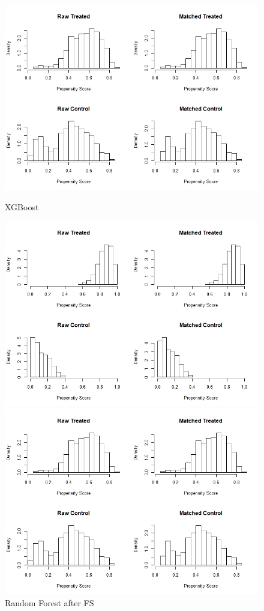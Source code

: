 \documentclass[11pt,a4paper,oneside]{article}
\begin{document}
\begin{figure}[!t]
        \includegraphics[width=\linewidth]{Figures/local_xgb_hist.jpeg}
        \caption{XGBoost}\label{fig:histogram5}
    \endminipage\hfill
        \includegraphics[width=\linewidth]{Figures/local_rf_nonpara_hist.jpeg}
        \caption{Random Forest after FS}\label{fig:histogram6}
    \endminipage\hfill
        \includegraphics[width=\linewidth]{Figures/local_xgb_hist.jpeg}

\end{figure}
\end{document}

